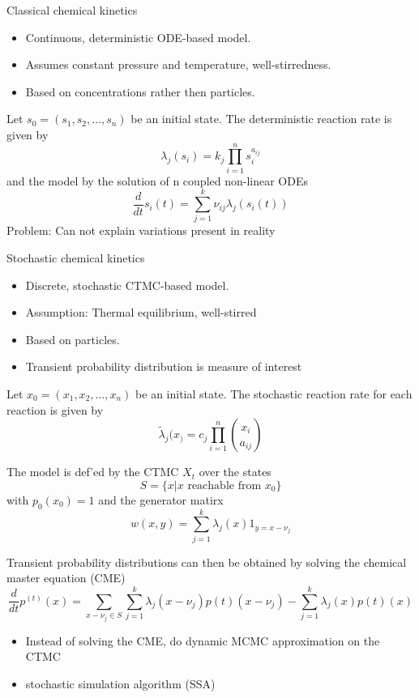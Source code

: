 \documentclass[rgb]{beamer}
\begin{document}
    \begin{frame}{Classical chemical kinetics}
        \begin{itemize}
            \item Continuous, deterministic ODE-based model.
            \item Assumes constant pressure and temperature, well-stirredness.
            \item Based on concentrations rather then particles.
        \end{itemize}
        \vskip 1cm
        Let $s_0 = (s_1, s_2, \dots, s_n)$ be an initial state. The deterministic reaction rate is given by 
            \[ \lambda_j (s_i) = k_j \prod_{i=1}^n s_i^{a_{ij}} \]
        and the model by the solution of n coupled non-linear ODEs
            \[ \frac{d}{dt} s_i(t) = \sum_{j = 1}^{k} \nu_{ij} \lambda_j (s_i(t))  \]
        \vfill
        Problem: Can not explain variations present in reality
    \end{frame}
    
    \begin{frame}[allowframebreaks]{Stochastic chemical kinetics}
    \begin{itemize}
        \item Discrete, stochastic CTMC-based model.
        \item Assumption: Thermal equilibrium, well-stirred
        \item Based on particles.
        \item Transient probability distribution is measure of interest
    \end{itemize}
    \vfill
    Let $x_0 = (x_1, x_2, \dots, x_n)$ be an initial state. The stochastic reaction rate for each reaction is given by 
        \[ \tilde\lambda_j (x_) = c_j \prod_{i=1}^n \binom{x_i}{a_{ij}} \]
        
    \framebreak
        
    The model is def'ed by the CTMC ${X_t}$ over the states $$S = \{x | x \text{ reachable from } x_0 \}$$ with $p_0(x_0) = 1$ and the generator matirx
        \[ w(x,y) = \sum_{j = 1}^k \lambda_j(x) 1_{y = x - \nu_j}  \]

        
    Transient probability distributions can then be obtained by solving the chemical master equation (CME)
    \[ \frac{d}{dt} p^{(t)} (x) = \sum_{x-\nu_j \in S} \sum_{j = 1}^{k} \lambda_j (x - \nu_{j}) p{(t)}(x - \nu_{j}) - \sum_{j = 1}^k \lambda_j (x) p{(t)}(x) \]
    
    \begin{itemize}
     \item Instead of solving the CME, do dynamic MCMC approximation on the CTMC
     \item stochastic simulation algorithm (SSA)
    \end{itemize}
    \end{frame}
    
\end{document}

